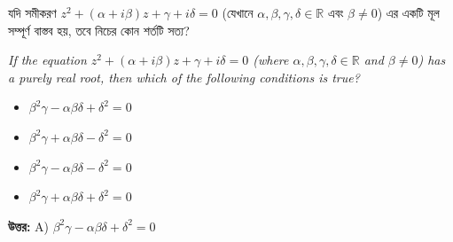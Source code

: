 \documentclass[12pt, a4paper]{article}
\begin{document}
\begin{tcolorbox}[questionbox={প্রশ্ন (Question) 13}]
    \noindent
    যদি সমীকরণ $z^2 + (\alpha + i\beta)z + \gamma + i\delta = 0$ (যেখানে $\alpha, \beta, \gamma, \delta \in \mathbb{R}$ এবং $\beta \neq 0$) এর একটি মূল সম্পূর্ণ বাস্তব হয়, তবে নিচের কোন শর্তটি সত্য?
    
    \vspace{0.8em}
    \begin{english}
    \noindent\textit{\color{darkgray}
    If the equation $z^2 + (\alpha + i\beta)z + \gamma + i\delta = 0$ (where $\alpha, \beta, \gamma, \delta \in \mathbb{R}$ and $\beta \neq 0$) has a purely real root, then which of the following conditions is true?
    }
    \end{english}
\end{tcolorbox}

\begin{itemize}[label={}, leftmargin=1cm, itemsep=0.5em]
    \item[\textbf{A)}] $\beta^2\gamma - \alpha\beta\delta + \delta^2 = 0$
    \item[\textbf{B)}] $\beta^2\gamma + \alpha\beta\delta - \delta^2 = 0$
    \item[\textbf{C)}] $\beta^2\gamma - \alpha\beta\delta - \delta^2 = 0$
    \item[\textbf{D)}] $\beta^2\gamma + \alpha\beta\delta + \delta^2 = 0$
\end{itemize}

\vspace{0.5em}
\begin{tcolorbox}[answerbox]
    \textbf{\color{success} উত্তর:} A) $\beta^2\gamma - \alpha\beta\delta + \delta^2 = 0$
\end{tcolorbox}
\vspace{1em}
\end{document}
